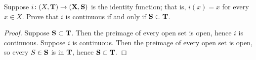 \setcounter{question}{3} %
\begin{question}[Macula]

Suppose $i \colon (X, \bf T) \rightarrow (X, \bf S)$ is the identity function; that is, $i(x) = x$ for every $x \in X$. Prove that $i$ is continuous if and only if $\bf S \subset \bf T$. 

\end{question}

\begin{proof}

Suppose $\bf S \subset \bf T$. Then the preimage of every open set is open, hence $i$ is continuous. Suppose $i$ is continuous. Then the preimage of every open set is open, so every $S \in \bf S$ is in $\bf T$, hence $\bf S \subset \bf T$.

\end{proof}




